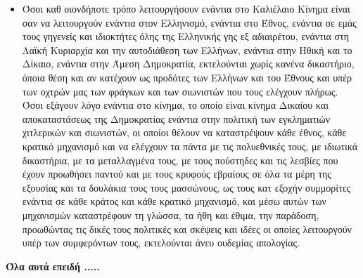 \documentclass[a4paper]{article}
\begin{document}
\begin{itemize}
\item Όσοι καθ οιονδήποτε τρόπο λειτουργήσουν ενάντια στο Καλιέλαιο Κίνημα είναι σαν να λειτουργούν ενάντια στον Ελληνισμό, ενάντια στο Έθνος, ενάντια σε εμάς τους γηγενείς και ιδιοκτήτες όλης της Ελληνικής γης εξ αδιαιρέτου, ενάντια στη Λαϊκή Κυριαρχία και την αυτοδιάθεση των Ελλήνων, ενάντια στην Ηθική και το Δίκαιο, ενάντια στην Άμεση Δημοκρατία, εκτελούνται χωρίς κανένα δικαστήριο, όποια θέση και αν κατέχουν ως προδότες των Ελλήνων και του Έθνους και υπέρ των οχτρών μας των φράγκων και των σιωνιστών που τους ελέγχουν πλήρως. Όσοι εξάγουν λόγο ενάντια στο κίνημα, το οποίο είναι κίνημα Δικαίου και αποκαταστάσεως της Δημοκρατίας  ενάντια στην πολιτική των εγκληματιών χιτλερικών και σιωνιστών, οι οποίοι θέλουν να καταστρέψουν κάθε έθνος, κάθε κρατικό μηχανισμό και να ελέγχουν τα πάντα με τις πολυεθνικές τους, με ιδιωτικά δικαστήρια, με τα μεταλλαγμένα τους, με τους πούστηδες και τις λεσβίες που έχουν προωθήσει παντού και με τους κρυφούς εβραίους σε όλα τα μέρη της εξουσίας και τα δουλάκια τους τους μασσώνους, ως τους κατ εξοχήν συμμορίτες ενάντια σε κάθε κράτος και κάθε κρατικό μηχανισμό, και μέσω αυτών των μηχανισμών καταστρέφουν τη γλώσσα, τα ήθη και έθιμα, την παράδοση, προωθώντας τις δικές τους πολιτικές και σκέψεις και ιδέες οι οποίες λειτουργούν υπέρ των συμφερόντων τους, εκτελούνται άνευ ουδεμίας απολογίας.
\end{itemize}

\textbf{Όλα αυτά επειδή .....}
\end{document}

